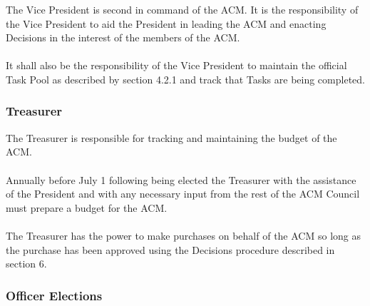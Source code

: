 \documentclass[12pt,titlepage]{article}
\begin{document}
The Vice President is second in command of the ACM. It is the responsibility of the Vice President to aid the President in leading the ACM and enacting Decisions in the interest of the members of the ACM.\\
\\
It shall also be the responsibility of the Vice President to maintain the official Task Pool as described by section 4.2.1 and track that Tasks are being completed.\\

\subsubsection{Treasurer}

The Treasurer is responsible for tracking and maintaining the budget of the ACM.\\
\\
Annually before July 1 following being elected the Treasurer with the assistance of the President and with any necessary input from the rest of the ACM Council must prepare a budget for the ACM.\\
\\
The Treasurer has the power to make purchases on behalf of the ACM so long as the purchase has been approved using the Decisions procedure described in section 6.

\subsubsection{Officer Elections}
\end{document}
